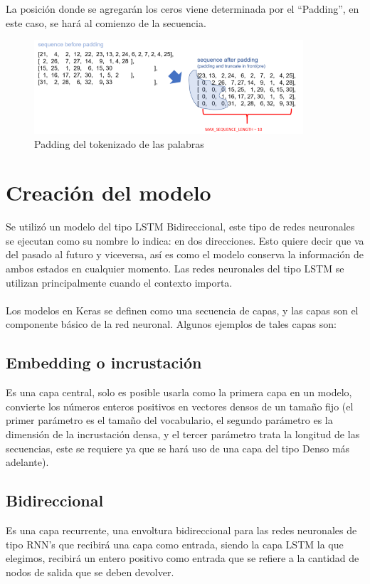 \documentclass[12pt, a4paper, titlepage]{article}
\begin{document}
	La posición donde se agregarán los ceros viene determinada por el “Padding”, en este caso, se hará al comienzo de la secuencia.
	\begin{figure}[H]
		\includegraphics[width=10cm]{./Imagenes/Modelo/padding.png}
		\centering 
		\caption{Padding del tokenizado de las palabras}
	\end{figure}	
	\newpage	
	\section{Creación del modelo}
	Se utilizó un modelo del tipo LSTM Bidireccional, este tipo de redes neuronales se ejecutan como su nombre lo indica: en dos direcciones. Esto quiere decir que va del pasado al futuro y viceversa, así es como el modelo conserva la información de ambos estados en cualquier momento. Las redes neuronales del tipo LSTM se utilizan principalmente cuando el contexto importa.\\\\
	Los modelos en Keras se definen como una secuencia de capas, y las capas son el componente básico de la red neuronal. Algunos ejemplos de tales capas son:
	\subsection{Embedding o incrustación}
	Es una capa central, solo es posible usarla como la primera capa en un modelo, convierte los números enteros positivos en vectores densos de un tamaño fijo (el primer parámetro es el tamaño del vocabulario, el segundo parámetro es la dimensión de la incrustación densa, y el tercer parámetro trata la longitud de las secuencias, este se requiere ya que se hará uso de una capa del tipo Denso más adelante).
	\begin{center}
		
	\end{center}
	\subsection{Bidireccional}
	Es una capa recurrente, una envoltura bidireccional para las redes neuronales de tipo RNN's que recibirá una capa como entrada, siendo la capa LSTM la que elegimos, recibirá un entero positivo como entrada que se refiere a la cantidad de nodos de salida que se deben devolver.
	\begin{center}
		
	\end{center}
\end{document}
